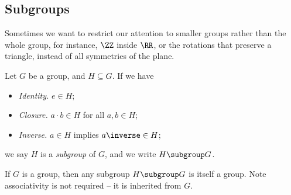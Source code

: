 \subsection{Subgroups}
\label{sec:subgroups}

Sometimes we want to restrict our attention to smaller groups rather than the whole group, for instance, \(\ZZ\) inside \(\RR\), or the rotations that preserve a triangle, instead of all symmetries of the plane.

\begin{definition}[Subgroup]
    \label{def:subgroup}%
    Let \(G\) be a group, and \(H \subseteq G\). If we have
    \begin{itemize}
        \item \emph{Identity.} \(e \in H\);
        \item \emph{Closure.} \(a \cdot b \in H\) for all \(a, b \in H\);
        \item \emph{Inverse.} \(a \in H\) implies \(a\inverse \in H\);
    \end{itemize}
    we say \(H\) is a \emph{subgroup} of \(G\), and we write \(H \subgroup G\).
\end{definition}

\begin{remark}
    If \(G\) is a group, then any subgroup \(H \subgroup G\) is itself a group. Note associativity is not required -- it is inherited from \(G\).
\end{remark}

